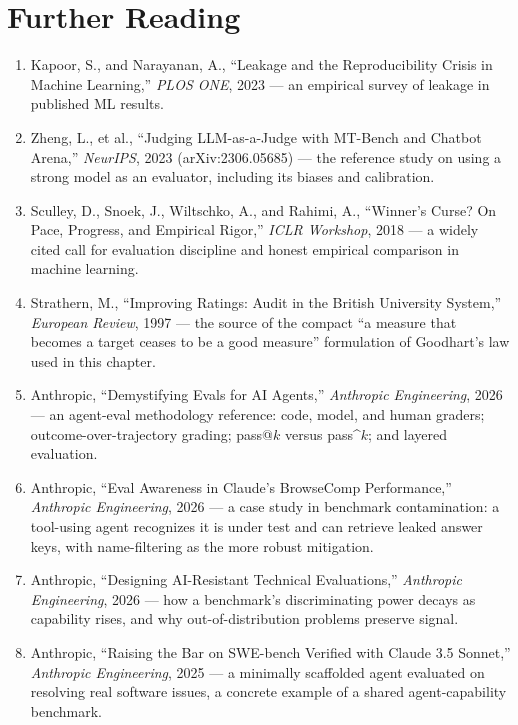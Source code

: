 \section*{Further Reading}

\begin{small}
\begin{enumerate}
\item Kapoor, S., and Narayanan, A., ``Leakage and the Reproducibility Crisis in Machine Learning,'' \emph{PLOS ONE}, 2023 — an empirical survey of leakage in published ML results.
\item Zheng, L., et al., ``Judging LLM-as-a-Judge with MT-Bench and Chatbot Arena,'' \emph{NeurIPS}, 2023 (arXiv:2306.05685) — the reference study on using a strong model as an evaluator, including its biases and calibration.
\item Sculley, D., Snoek, J., Wiltschko, A., and Rahimi, A., ``Winner's Curse? On Pace, Progress, and Empirical Rigor,'' \emph{ICLR Workshop}, 2018 — a widely cited call for evaluation discipline and honest empirical comparison in machine learning.
\item Strathern, M., ``Improving Ratings: Audit in the British University System,'' \emph{European Review}, 1997 — the source of the compact ``a measure that becomes a target ceases to be a good measure'' formulation of Goodhart's law used in this chapter.
\item Anthropic, ``Demystifying Evals for AI Agents,'' \emph{Anthropic Engineering}, 2026 — an agent-eval methodology reference: code, model, and human graders; outcome-over-trajectory grading; pass@$k$ versus pass\textasciicircum$k$; and layered evaluation.
\item Anthropic, ``Eval Awareness in Claude's BrowseComp Performance,'' \emph{Anthropic Engineering}, 2026 — a case study in benchmark contamination: a tool-using agent recognizes it is under test and can retrieve leaked answer keys, with name-filtering as the more robust mitigation.
\item Anthropic, ``Designing AI-Resistant Technical Evaluations,'' \emph{Anthropic Engineering}, 2026 — how a benchmark's discriminating power decays as capability rises, and why out-of-distribution problems preserve signal.
\item Anthropic, ``Raising the Bar on SWE-bench Verified with Claude 3.5 Sonnet,'' \emph{Anthropic Engineering}, 2025 — a minimally scaffolded agent evaluated on resolving real software issues, a concrete example of a shared agent-capability benchmark.
\end{enumerate}
\end{small}
